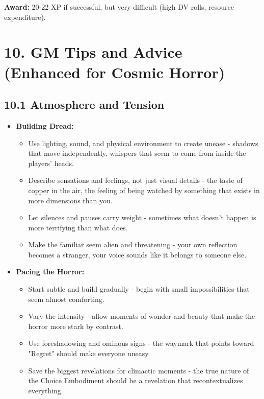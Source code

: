 \documentclass[11pt]{article}
\begin{document}
\textbf{Award:} 20-22 XP if successful, but very difficult (high DV rolls, resource expenditure).

\clearpage

\section*{10. GM Tips and Advice (Enhanced for Cosmic Horror)}

\subsection*{10.1 Atmosphere and Tension}

\begin{itemize}
\item \textbf{Building Dread:}
\begin{itemize}
\item Use lighting, sound, and physical environment to create unease - shadows that move independently, whispers that seem to come from inside the players' heads.
\item Describe sensations and feelings, not just visual details - the taste of copper in the air, the feeling of being watched by something that exists in more dimensions than you.
\item Let silences and pauses carry weight - sometimes what doesn't happen is more terrifying than what does.
\item Make the familiar seem alien and threatening - your own reflection becomes a stranger, your voice sounds like it belongs to someone else.
\end{itemize}
\item \textbf{Pacing the Horror:}
\begin{itemize}
\item Start subtle and build gradually - begin with small impossibilities that seem almost comforting.
\item Vary the intensity - allow moments of wonder and beauty that make the horror more stark by contrast.
\item Use foreshadowing and ominous signs - the waymark that points toward "Regret" should make everyone uneasy.
\item Save the biggest revelations for climactic moments - the true nature of the Choice Embodiment should be a revelation that recontextualizes everything.
\end{itemize}
\end{itemize}
\end{document}
